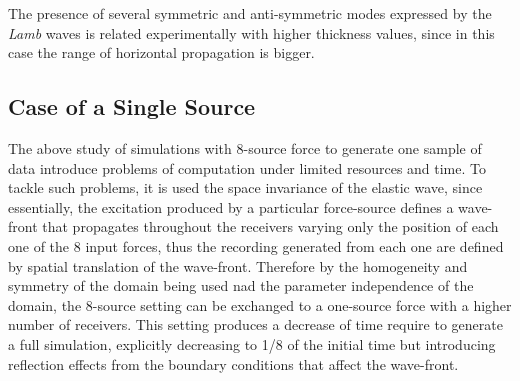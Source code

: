 \begin{rem}
The presence of several symmetric and anti-symmetric modes expressed by the \textit{Lamb} waves is related experimentally with higher thickness values, since in this case the range of horizontal propagation is bigger.
\end{rem}


\subsection{Case of a Single Source}
The above study of simulations with 8-source force to generate one sample of data introduce problems of computation under limited resources and time. 
To tackle such problems, it is used the space invariance of the elastic wave, since essentially, the excitation produced by a particular force-source defines a wave-front that propagates throughout the receivers varying only the position of each one of the 8 input forces, thus the recording generated from each one are defined by spatial translation of the wave-front. Therefore by the homogeneity and symmetry of the domain being used nad the parameter independence of the domain, the 8-source setting can be exchanged to a one-source force with a higher number of receivers. This setting produces a decrease of time require to generate a full simulation, explicitly decreasing to 1/8 of the initial time but introducing reflection effects from the boundary conditions that affect the wave-front.

